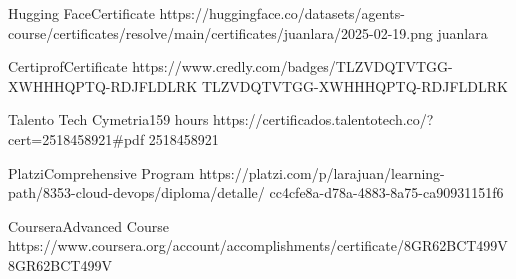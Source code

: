 \documentclass[a4paper,10pt]{article}
\begin{document}


{Hugging Face}{Certificate}
{%
\vspace{-0.8em}
}
{https://huggingface.co/datasets/agents-course/certificates/resolve/main/certificates/juanlara/2025-02-19.png}
{juanlara}


{Certiprof}{Certificate}
{%
\vspace{-0.8em}
}
{https://www.credly.com/badges/TLZVDQTVTGG-XWHHHQPTQ-RDJFLDLRK}
{TLZVDQTVTGG-XWHHHQPTQ-RDJFLDLRK}


{Talento Tech Cymetria}{159 hours}
{%
\vspace{-0.8em}
}
{https://certificados.talentotech.co/?cert=2518458921#pdf}
{2518458921}


{Platzi}{Comprehensive Program}
{%
\vspace{-0.8em}
}
{https://platzi.com/p/larajuan/learning-path/8353-cloud-devops/diploma/detalle/}
{cc4cfe8a-d78a-4883-8a75-ca90931151f6}


{Coursera}{Advanced Course}
{%
\vspace{-0.8em}
}
{https://www.coursera.org/account/accomplishments/certificate/8GR62BCT499V}
{8GR62BCT499V}
\end{document}

